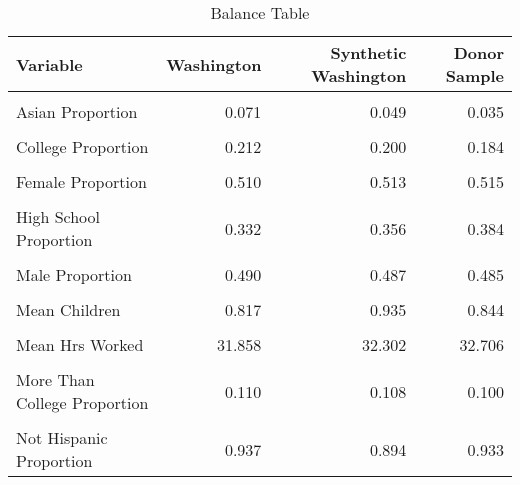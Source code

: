 \begin{table}[H]

\caption{\label{tab:balance_table_washington}Balance Table}
\centering
\begin{tabular}[t]{lrrr}
\toprule
Variable & Washington & Synthetic Washington & Donor Sample\\
\midrule
\cellcolor{gray!6}{American Indian Proportion} & \cellcolor{gray!6}{0.014} & \cellcolor{gray!6}{0.014} & \cellcolor{gray!6}{0.014}\\
Asian Proportion & 0.071 & 0.049 & 0.035\\
\cellcolor{gray!6}{Black Proportion} & \cellcolor{gray!6}{0.026} & \cellcolor{gray!6}{0.061} & \cellcolor{gray!6}{0.098}\\
College Proportion & 0.212 & 0.200 & 0.184\\
\cellcolor{gray!6}{Employed Proportion} & \cellcolor{gray!6}{0.719} & \cellcolor{gray!6}{0.728} & \cellcolor{gray!6}{0.726}\\
\addlinespace
Female Proportion & 0.510 & 0.513 & 0.515\\
\cellcolor{gray!6}{Hispanic Proportion} & \cellcolor{gray!6}{0.063} & \cellcolor{gray!6}{0.106} & \cellcolor{gray!6}{0.067}\\
High School Proportion & 0.332 & 0.356 & 0.384\\
\cellcolor{gray!6}{Less Than High School Proportion} & \cellcolor{gray!6}{0.065} & \cellcolor{gray!6}{0.072} & \cellcolor{gray!6}{0.090}\\
Male Proportion & 0.490 & 0.487 & 0.485\\
\addlinespace
\cellcolor{gray!6}{Married Proportion} & \cellcolor{gray!6}{0.626} & \cellcolor{gray!6}{0.638} & \cellcolor{gray!6}{0.627}\\
Mean Children & 0.817 & 0.935 & 0.844\\
\cellcolor{gray!6}{Mean Children U5} & \cellcolor{gray!6}{0.173} & \cellcolor{gray!6}{0.202} & \cellcolor{gray!6}{0.174}\\
Mean Hrs Worked & 31.858 & 32.302 & 32.706\\
\cellcolor{gray!6}{Median Income} & \cellcolor{gray!6}{22900.000} & \cellcolor{gray!6}{21956.634} & \cellcolor{gray!6}{21327.955}\\
\addlinespace
More Than College Proportion & 0.110 & 0.108 & 0.100\\
\cellcolor{gray!6}{Not Employed Proportion} & \cellcolor{gray!6}{0.281} & \cellcolor{gray!6}{0.272} & \cellcolor{gray!6}{0.274}\\
Not Hispanic Proportion & 0.937 & 0.894 & 0.933\\

\end{tabular}
\end{table}
